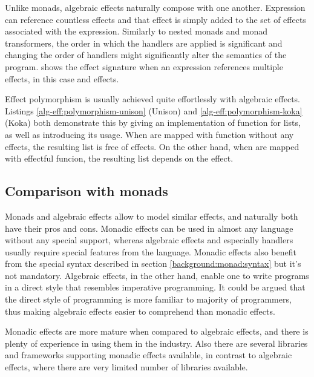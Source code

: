 Unlike monads, algebraic effects naturally compose with one another. Expression can reference countless effects and that effect is simply added to the set of effects associated with the expression. Similarly to nested monads and monad transformers, the order in which the handlers are applied is significant and changing the order of handlers might significantly alter the semantics of the program.  shows the effect signature when an expression references multiple effects, in this case  and  effects.



Effect polymorphism is usually achieved quite effortlessly with algebraic effects. Listings \ref{alg-eff:polymorphism-unison} (Unison) and \ref{alg-eff:polymorphism-koka} (Koka) both demonstrate this by giving an implementation of  function for lists, as well as introducing its usage. When  are mapped with function without any effects, the resulting list  is free of effects. On the other hand, when  are mapped with effectful funcion, the resulting list  depends on the  effect. 






\subsection{Comparison with monads}
Monads and algebraic effects allow to model similar effects, and naturally both have their pros and cons. Monadic effects can be used in almost any language without any special support, whereas algebraic effects and especially handlers usually require special features from the language. Monadic effects also benefit from the special syntax described in section \ref{background:monad:syntax} but it's not mandatory. Algebraic effects, in the other hand, enable one to write programs in a direct style that resembles imperative programming. It could be argued that the direct style of programming is more familiar to majority of programmers, thus making algebraic effects easier to comprehend than monadic effects.

Monadic effects are more mature when compared to algebraic effects, and there is plenty of experience in using them in the industry. Also there are several libraries and frameworks supporting monadic effects available, in contrast to algebraic effects, where there are very limited number of libraries available.

